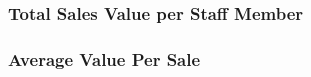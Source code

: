 \documentclass{article}
\begin{document}
            \subsubsection{Total Sales Value per Staff Member}



            \subsubsection{Average Value Per Sale}

\end{document}
